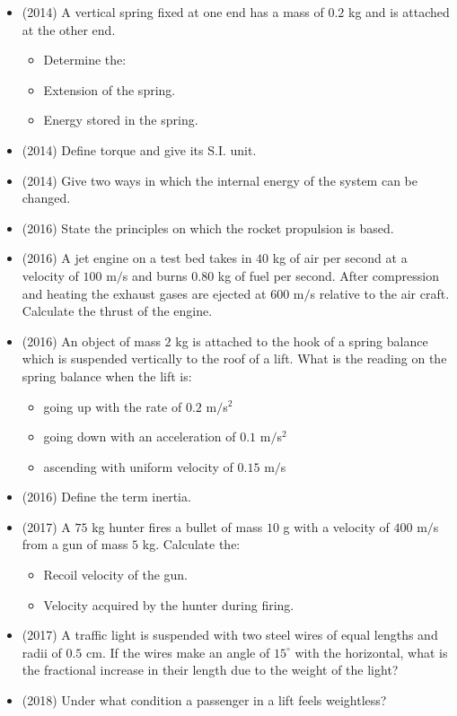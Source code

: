 \documentclass{article}
\begin{document}
\begin{itemize}
\item (2014)  A vertical spring fixed at one end has a mass of $ 0.2$ kg and is attached at the other end.\begin{itemize}
\item Determine the:
\item Extension of the spring.
\item Energy stored in the spring.
\end{itemize}
\item (2014)  Define torque and give its S.I. unit.
\item (2014)  Give two ways in which the internal energy of the system can be changed.
\item (2016)  State the principles on which the rocket propulsion is based. 
\item (2016)  A jet engine on a test bed takes in $ 40$ kg of air per second at a velocity of $ 100$ m$/$s  and burns $ 0.80$ kg of fuel per second. After compression and heating the exhaust gases are ejected at $ 600$ m$/$s relative to the air craft. Calculate the thrust of the engine.
\item (2016)  An object of mass $ 2$ kg is attached to the hook of a spring balance which is suspended vertically to the roof of a lift.  What is the reading on the spring balance when the lift is:\begin{itemize}
\item going up with the rate of $ 0.2$ m$/$s$ ^{2}$
\item going down with an acceleration of $ 0.1$ m$/$s$ ^{2}$
\item ascending with uniform velocity of $ 0.15$ m$/$s
\end{itemize}
\item (2016)  Define the term inertia.
\item (2017)  A $ 75$ kg hunter fires a bullet of mass $ 10$ g with a velocity of $ 400$ m$/$s from a gun of mass $ 5$ kg. Calculate the:\begin{itemize}
\item Recoil velocity of the gun. 
\item Velocity acquired by the hunter during firing.
\end{itemize}
\item (2017)  A traffic light is suspended with two steel wires of equal lengths and radii of $ 0.5$ cm. If the wires make an angle of $ 15^{\circ}$ with the horizontal, what is the fractional increase in their length due to the weight of the light? 
\item (2018)  Under what condition a passenger in a lift feels weightless? 

\end{itemize}
\end{document}
